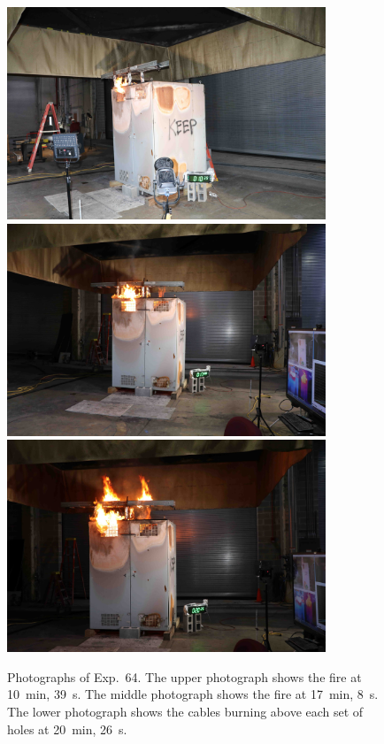 \begin{figure}[p]
\centering
\includegraphics[height=2.50in]{../FIGURES/Test_64_10_min_39_s} \\ \vspace{0.1in}
\includegraphics[height=2.50in]{../FIGURES/Test_64_17_min_8_s} \\ \vspace{0.1in}
\includegraphics[height=2.50in]{../FIGURES/Test_64_20_min_26_s}
\caption[Photographs of Exp.~64]{Photographs of Exp.~64. The upper photograph shows the fire at 10~min, 39~s. The middle photograph shows the fire at 17~min, 8~s. The lower photograph shows the cables burning above each set of holes at 20~min, 26~s.}
\label{fig:Test_64_photos}
\end{figure}


